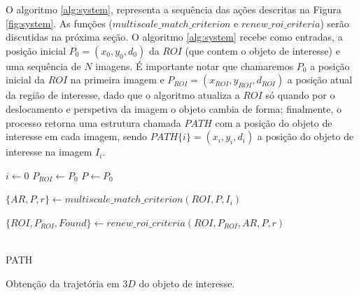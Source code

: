 O algoritmo \ref{alg:system}, representa a sequência das 
ações descritas na Figura \ref{fig:system}. As funções 
 ($multiscale\_match\_criterion$ e $renew\_roi\_criteria$) serão discutidas na próxima seção. 
O algoritmo \ref{alg:system} recebe como entradas, a posição inicial $P_0=(x_0, y_0, d_0)$
da $ROI$ (que contem o objeto de interesse)  
e uma sequência de $N$ imagens. É importante notar que chamaremos $P_0$ a posição inicial
da $ROI$ na primeira imagem e $P_{ROI}=(x_{ROI}, y_{ROI}, d_{ROI})$ a posição atual da região
de interesse, dado que o algoritmo atualiza a $ROI$ só quando por o deslocamento e perspetiva da imagem
o objeto cambia de forma; finalmente, o processo retorna 
uma estrutura chamada $PATH$ com a posição do objeto de interesse em cada imagem, sendo $PATH\{i\}=(x_i,y_i,d_i)$
a posição do objeto de interesse na imagem $I_i$.

\begin{algorithm}
 $i \leftarrow 0$ \;
 $P_{ROI} \leftarrow P_0$ \;
 $P \leftarrow P_0$ \;
~\\
{
    $\{AR,P,r\} \leftarrow multiscale\_match\_criterion(ROI,P,I_i)$\;
    
    $\{ROI,P_{ROI},Found\} \leftarrow renew\_roi\_criteria(ROI,P_{ROI},AR,P,r)$\;
}
~\\
\Return PATH \;
\caption{Obtenção da trajetória em $3D$ do objeto de interesse.}
\label{alg:system}
\end{algorithm}

